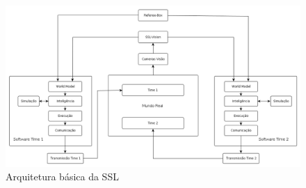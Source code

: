 \begin{landscape}
  \begin{figure}[thpb]
    \centering
    \includegraphics[width=20cm]{img/arquitetura_ssl}
    \caption{Arquitetura básica da SSL}
    \label{arquitetura_ssl}
  \end{figure}
\end{landscape}
